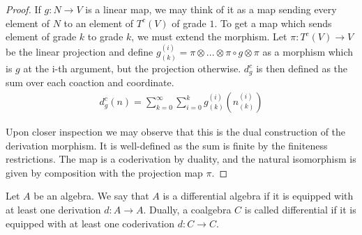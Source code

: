\documentclass[../thesis.tex]{subfiles}
\begin{document}
\begin{proof}
                If $g: N \rightarrow V$ is a linear map, we may think of it as a map sending every element of $N$ to an element of $T^c(V)$ of grade $1$. To get a map which sends element of grade $k$ to grade $k$, we must extend the morphism. Let $\pi : T^c(V) \rightarrow V$ be the linear projection and define $g_{(k)}^{(i)} = \pi\otimes ... \otimes \pi \circ g \otimes \pi$ as a morphism which is $g$ at the i-th argument, but the projection otherwise. $d_g^c$ is then defined as the sum over each coaction and coordinate.
                \begin{align*}
                    d_g^c(n) = \sum_{k=0}^\infty \sum_{i=0}^k g_{(k)}^{(i)}(n_{(k)}^{(i)})
                \end{align*}
                
                Upon closer inspection we may observe that this is the dual construction of the derivation morphism. It is well-defined as the sum is finite by the finiteness restrictions. The map is a coderivation by duality, and the natural isomorphism is given by composition with the projection map $\pi$.
            \end{proof}

            \begin{definition}
                Let $A$ be an algebra. We say that $A$ is a differential algebra if it is equipped with at least one derivation $d:A\rightarrow A$. Dually, a coalgebra $C$ is called differential if it is equipped with at least one coderivation $d:C\rightarrow C$.
            \end{definition}
\end{document}
